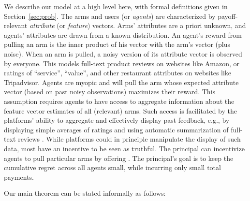 We describe our model at a high level here,
with formal definitions given in Section~\ref{sec:prob}.
The \ARMNUM arms and users (or \emph{agents})
are characterized by payoff-relevant
\emph{attribute} (or \emph{feature}) vectors.
Arms' attributes are a priori unknown,
and agents' attributes are drawn from a known distribution.
An agent's reward from pulling an arm is the inner product of his
vector with the arm's vector (plus noise).
When an arm is pulled, a noisy version of its attribute vector is
observed by everyone.
This models full-text product reviews on websites like Amazon,
or ratings of ``service'', ``value'',
and other restaurant attributes on websites like Tripadvisor.  
Agents are myopic and will pull the arm whose expected attribute
vector (based on past noisy observations) maximizes their reward.
This assumption requires agents to have access to aggregate
information about the feature vector estimates of all (relevant) arms. 
Such access is facilitated by the platforms' ability to aggregate and
effectively display past feedback, e.g., by displaying simple averages
of ratings and using automatic summarization of full-text reviews 
\citep{wang2010product,liu2012movie,abulaish2009feature}.
While platforms could in principle manipulate the display of such
data, most have an incentive to be seen as truthful.
The principal can incentivize agents to pull particular arms by
offering .
The principal's goal is to keep the cumulative regret across all
agents small, while incurring only small total payments.

Our main theorem can be stated informally as follows:

